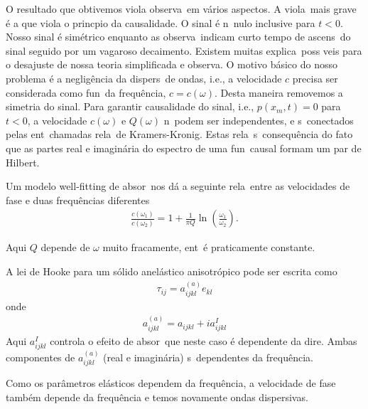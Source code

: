O resultado que obtivemos viola observa\coes\ em v\'arios aspectos. A
viola\cao\ mais grave \'e a que viola o princ\ih pio da causalidade. O
sinal \'e n\ao\ nulo inclusive para $t<0$. Nosso sinal \'e sim\'etrico
enquanto as observa\coes\ indicam curto tempo de ascens\ao\ do sinal
seguido por um vagaroso decaimento. Existem muitas explica\coes\ poss\ih
veis para o desajuste de nossa teoria simplificada e observa\coes. O
motivo b\'asico do nosso problema \'e a neglig\^encia da dispers\ao\ de
ondas, i.e., a velocidade $c$ precisa ser considerada como fun\cao\ da
frequ\^encia, $c=c(\omega)$. Desta maneira removemos a simetria do
sinal. Para garantir causalidade do sinal, i.e., $p(x_m,t)=0$ para
$t<0$, a velocidade $c(\omega)$ e $Q(\omega)$ n\ao\ podem ser
independentes, e s\ao\ conectados pelas ent\ao\ chamadas rela\coes\ de
Kramers-Kronig. Estas rela\coes\ s\ao\ consequ\^encia do fato que as
partes real e imagin\'aria do espectro de uma fun\cao\ causal formam um
par de Hilbert.

Um modelo well-fitting de absor\cao\ nos d\'a a seguinte rela\cao\ entre
as velocidades de fase e duas frequ\^encias diferentes
\begin{eqnarray}
\frac{c(\omega_1)}{c(\omega_2)} = 1 + \frac{1}{\pi Q}\ln\left(\frac{\omega_1}{\omega_2}\right).
\end{eqnarray}

Aqui $Q$ depende de $\omega$ muito fracamente, ent\ao\ \'e praticamente
constante.

A lei de Hooke para um s\'olido anel\'astico anisotr\'opico pode ser
escrita como
\begin{eqnarray}
\tau_{ij} = a_{ijkl}^{(a)}e_{kl}
\end{eqnarray}
onde
\begin{eqnarray}
a_{ijkl}^{(a)} = a_{ijkl} + ia_{ijkl}^I
\end{eqnarray}    
Aqui $a_{ijkl}^I$ controla o efeito de absor\cao\ que neste caso \'e
dependente da dire\cao. Ambas componentes de $a_{ijkl}^{(a)}$ (real e
imagin\'aria) s\ao\ dependentes da frequ\^encia.

Como os par\^ametros el\'asticos dependem da frequ\^encia, a velocidade
de fase tamb\'em depende da frequ\^encia e temos novamente ondas
dispersivas.

